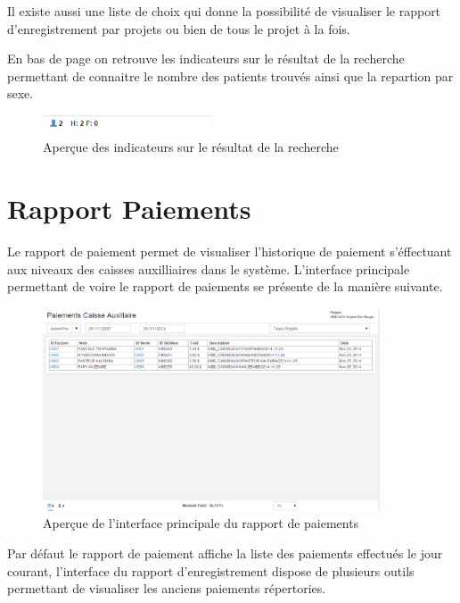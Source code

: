 \documentclass[12pt,a4paper]{report}
\begin{document}
Il existe aussi une liste de choix qui donne la possibilité de visualiser le rapport d'enregistrement par projets ou bien de tous le projet à la fois.

En bas de page on retrouve les indicateurs sur le résultat de la recherche permettant de connaitre le nombre des patients trouvés  ainsi que la repartion par sexe. 

\begin{figure}[h]
\begin{center}
\includegraphics[width=5cm]{pic/IndicRecherche.png}
\end{center}
\caption{Aperçue des indicateurs sur le résultat de la recherche}
\label{Aperçue des indicateurs sur le résultat de la recherche}
\end{figure}

\newpage
\section{Rapport Paiements}
Le rapport de paiement permet de visualiser l'historique de paiement s'éffectuant aux niveaux des caisses auxilliaires dans le système. L'interface principale permettant de voire le rapport de paiements se présente de la manière suivante. 

\begin{figure}[h]
\begin{center}
\includegraphics[width=10cm]{pic/rapportCaisseAux.png}
\end{center}
\caption{Aperçue de l'interface principale du rapport de paiements}
\label{Aperçue de l'interface principale du rapport de paiements}
\end{figure}

Par défaut le rapport de paiement affiche la liste des paiements effectués le jour courant, l'interface du rapport d'enregistrement dispose de plusieurs outils permettant de visualiser les anciens paiements répertories.
\end{document}
